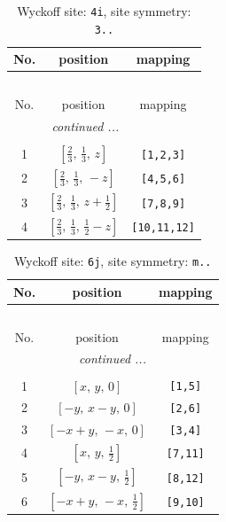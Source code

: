 \documentclass[fleqn,8pt]{jsarticle}
\begin{document}
\renewcommand{\arraystretch}{1.2}
\begin{longtable}{ccc}
\caption{Wyckoff site: {\tt 4i}, site symmetry: {\tt 3..}}
 \\
 \hline \hline
No. & position & mapping \\ \hline \endfirsthead

\multicolumn{2}{l}{\tablename\ \thetable{}} \\
 \hline \hline
No. & position & mapping \\ \hline \endhead

 \hline \hline
\multicolumn{2}{r}{\footnotesize\it continued ...} \\ \endfoot

 \hline \hline
\multicolumn{2}{r}{} \\ \endlastfoot

1 & $\left[ \frac{2}{3},\, \frac{1}{3},\, z \right]$ & {\tt [1,2,3]} \\ \hline
2 & $\left[ \frac{2}{3},\, \frac{1}{3},\, - z \right]$ & {\tt [4,5,6]} \\ \hline
3 & $\left[ \frac{2}{3},\, \frac{1}{3},\, z + \frac{1}{2} \right]$ & {\tt [7,8,9]} \\ \hline
4 & $\left[ \frac{2}{3},\, \frac{1}{3},\, \frac{1}{2} - z \right]$ & {\tt [10,11,12]} \\
\end{longtable}
\renewcommand{\arraystretch}{1.2}
\begin{longtable}{ccc}
\caption{Wyckoff site: {\tt 6j}, site symmetry: {\tt m..}}
 \\
 \hline \hline
No. & position & mapping \\ \hline \endfirsthead

\multicolumn{2}{l}{\tablename\ \thetable{}} \\
 \hline \hline
No. & position & mapping \\ \hline \endhead

 \hline \hline
\multicolumn{2}{r}{\footnotesize\it continued ...} \\ \endfoot

 \hline \hline
\multicolumn{2}{r}{} \\ \endlastfoot

1 & $\left[ x,\, y,\, 0 \right]$ & {\tt [1,5]} \\ \hline
2 & $\left[ - y,\, x - y,\, 0 \right]$ & {\tt [2,6]} \\ \hline
3 & $\left[ - x + y,\, - x,\, 0 \right]$ & {\tt [3,4]} \\ \hline
4 & $\left[ x,\, y,\, \frac{1}{2} \right]$ & {\tt [7,11]} \\ \hline
5 & $\left[ - y,\, x - y,\, \frac{1}{2} \right]$ & {\tt [8,12]} \\ \hline
6 & $\left[ - x + y,\, - x,\, \frac{1}{2} \right]$ & {\tt [9,10]} \\
\end{longtable}
\end{document}
